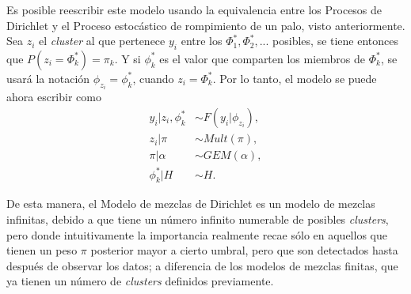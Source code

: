 Es posible reescribir este modelo usando la equivalencia entre los Procesos de Dirichlet y el Proceso estoc\'astico de rompimiento de un palo, visto anteriormente. Sea $z_i$ el \textit{cluster} al que pertenece $y_i$ entre los $\Phi_1^*,\Phi_2^*,...$ posibles, se tiene entonces que $P(z_i = \Phi_k^*) = \pi_k$. Y si $\phi_k^*$ es el valor que comparten los miembros de $\Phi_k^*$, se usar\'a la notaci\'on $\phi_{z_i} = \phi_k^*$, cuando $z_i = \Phi_k^*$. Por lo tanto, el modelo se puede ahora escribir como
\begin{equation*}
\begin{aligned}
   y_i | z_i, \phi_k^* &\sim F(y_i | \phi_{z_i}), \\
   z_i | \pi &\sim Mult(\pi), \\
   \pi | \alpha &\sim GEM(\alpha), \\
   \phi_k^* | H &\sim H.
\end{aligned}
\end{equation*}

De esta manera, el Modelo de mezclas de Dirichlet es un modelo de mezclas infinitas, debido a que tiene un n\'umero infinito numerable de posibles \textit{clusters}, pero donde intuitivamente la importancia realmente recae s\'olo en aquellos que tienen un peso $\pi$ posterior mayor a cierto umbral, pero que son detectados hasta despu\'es de observar los datos; a diferencia de los modelos de mezclas finitas, que ya tienen un n\'umero de \textit{clusters} definidos previamente.

\newpage